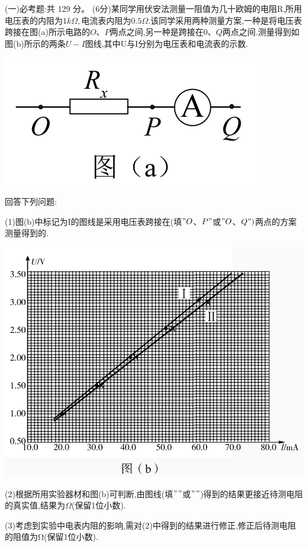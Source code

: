 (一)必考题:共 129 分。
\question[6] (6分)某同学用伏安法测量一阻值为几十欧姆的电阻R,所用电压表的内阻为$1kΩ,$电流表内阻为$0.5Ω.$该同学采用两种测量方案,一种是将电压表跨接在图(a)所示电路的$O、P$两点之间,另一种是跨接在$0、Q$两点之间.测量得到如图(b)所示的两条$U-I$图线,其中U与I分别为电压表和电流表的示数.
\begin{center}
    \includegraphics[]{img/image10.png}
\end{center}
回答下列问题:

(1)图(b)中标记为I的图线是采用电压表跨接在(填$"O$、$P"$或$"O$、$Q")$两点的方案测量得到的.
\begin{center}
    \includegraphics[]{img/image11.png}
\end{center}
(2)根据所用实验器材和图(b)可判断,由图线\key{\uppercase\expandafter{\romannumeral1}}(填$"$\uppercase\expandafter{}$"$或$"$\uppercase\expandafter{}$"$)得到的结果更接近待测电阻的真实值,结果为$Ω$(保留1位小数).

(3)考虑到实验中电表内阻的影响,需对(2)中得到的结果进行修正,修正后待测电阻的阻值为Ω(保留1位小数).



